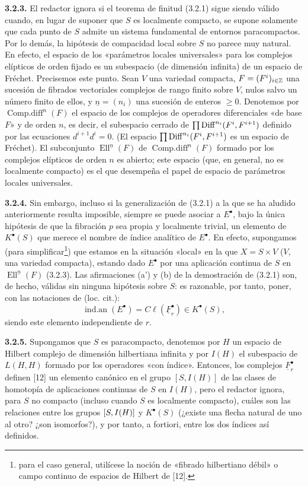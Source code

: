 \textbf{3.2.3.} El redactor ignora si el teorema de finitud (3.2.1) sigue siendo válido cuando, en lugar de suponer que $S$ es localmente compacto, se supone solamente que cada punto de $S$ admite un sistema fundamental de entornos paracompactos. Por lo demás, la hipótesis de compacidad local sobre $S$ no parece muy natural. En efecto, el espacio de los «parámetros locales universales» para los complejos elípticos de orden fijado es un subespacio (de dimensión infinita) de un espacio de Fréchet. Precisemos este punto. Sean $V$ una variedad compacta, $F=(F^i)_{i\in\Z}$ una sucesión de fibrados vectoriales complejos de rango finito sobre $V$, nulos salvo un número finito de ellos, y $\underline n=(n_i)$ una sucesión de enteros $\geq 0$. Denotemos por $\operatorname{Comp.diff}^n(F)$ el espacio de los complejos de operadores diferenciales «de base $F$» y de orden $n$, es decir, el subespacio cerrado de $\prod\Diff^{n_i}(F^i,F^{i+1})$ definido por las ecuaciones $d^{i+1}d^i=0$. (El espacio $\prod\Diff^{n_i}(F^i,F^{i+1})$ es un espacio de Fréchet). El subconjunto $\operatorname{Ell}^{\underline n}(F)$ de $\operatorname{Comp.diff}^n(F)$ formado por los complejos elípticos de orden $n$ es abierto; este espacio (que, en general, no es localmente compacto) es el que desempeña el papel de espacio de parámetros locales universales.

\textbf{3.2.4.} Sin embargo, incluso si la generalización de (3.2.1) a la que se ha aludido anteriormente resulta imposible, siempre se puede asociar a $E^\bullet$, bajo la única hipótesis de que la fibración $p$ sea propia y localmente trivial, un elemento de $K^\bullet(S)$ que merece el nombre de índice analítico de $E^\bullet$. En efecto, supongamos (para simplificar\footnote{para el caso general, utilícese la noción de «fibrado hilbertiano débil» o campo continuo de espacios de Hilbert de [12].}) que estamos en la situación «local» en la que $X=S\times V$ ($V$, una variedad compacta), estando dado $E^\bullet$ por una aplicación continua de $S$ en $\operatorname{Ell}^{\underline n}(F)$ (3.2.3). Las afirmaciones (a') y (b) de la demostración de (3.2.1) son, de hecho, válidas sin ninguna hipótesis sobre $S$: es razonable, por tanto, poner, con las notaciones de (loc. cit.):
\[
 \operatorname{ind.an}(E^\bullet)=C\ell(\underline F_r^\bullet)\in K^\bullet(S),
\]
siendo este elemento independiente de $r$.

\textbf{3.2.5.} Supongamos que $S$ es paracompacto, denotemos por $H$ un espacio de Hilbert complejo de dimensión hilbertiana infinita y por $I(H)$ el subespacio de $L(H,H)$ formado por los operadores «con índice». Entonces, los complejos $\underline F_r^\bullet$ definen [12] un elemento canónico en el grupo $[S,I(H)]$ de las clases de homotopía de aplicaciones continuas de $S$ en $I(H)$, pero el redactor ignora, para $S$ no compacto (incluso cuando $S$ es localmente compacto), cuáles son las relaciones entre los grupos $\sisi{[S,I(S)]}{[S,I(H)]}$ y $K^\bullet(S)$ (¿existe una flecha natural de uno al otro? ¿son isomorfos?), y por tanto, a fortiori, entre los dos índices así definidos.

